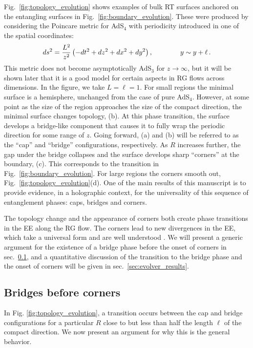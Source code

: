\documentclass[11 pt]{article}
\begin{document}
Fig.\ \ref{fig:topology_evolution} shows examples of bulk 
RT surfaces anchored on the entangling surfaces in Fig.\ \ref{fig:boundary_evolution}. These were produced by considering the Poincare metric for AdS$_4$ with periodicity introduced in one of the spatial coordinates:
\begin{equation} \label{ads4_metric}
    ds^2 = \frac{L^2}{z^2}\left(-dt^2+dz^2+dx^2+dy^2\right),\hspace{40 pt} y\sim y+\ell\,.
\end{equation}
This metric does not become asymptotically AdS$_3$ for $z\to \infty$, but it will be shown later that it is a good model for certain aspects in RG flows across dimensions. In the figure, we take $L=\ell=1$. For small regions the minimal surface is a hemisphere, unchanged from the case of pure AdS$_4$. However, at some point as the size of the region approaches the size of the compact direction, the minimal surface changes topology, (b). At this phase transition, the surface develops a bridge-like component that causes it to fully wrap the periodic direction for some range of $z$. Going forward, (a) and (b) will be referred to as the ``cap'' and ``bridge'' configurations, respectively. As $R$ increases further, the gap under the bridge collapses and the surface develops sharp ``corners'' at the boundary, (c). This corresponds to the transition in Fig.~\ref{fig:boundary_evolution}. For large regions the corners smooth out, Fig.\ \ref{fig:topology_evolution}(d). One of the main results of this manuscript is to provide evidence, in a holographic context, for the universality of this sequence of entanglement phases: caps, bridges and corners. 

The topology change and the appearance of corners both create phase transitions in the EE along the RG flow. The corners lead to new divergences in the EE, which take a universal form and are well understood \cite{Myers2012}. We will present a generic argument for the existence of a bridge phase before the onset of corners in sec.~\ref{sec:bridge_argument}, and a quantitative discussion of the transition to the bridge phase and the onset of corners will be given in sec.~\ref{sec:evolver_results}.


\subsection{Bridges before corners} \label{sec:bridge_argument}

In Fig. \ref{fig:topology_evolution}, a transition occurs between the cap and bridge configurations for a particular $R$ close to but less than half the length $\ell$ of the compact direction. We now present an argument for why this is the general behavior.
\end{document}
